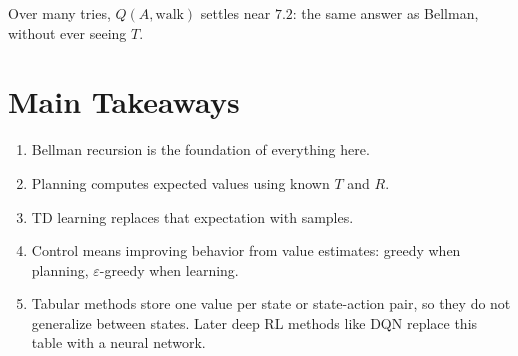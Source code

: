 \documentclass[11pt]{article}
\begin{document}
Over many tries, $Q(A, \text{walk})$ settles near $7.2$: the same answer as Bellman,
without ever seeing $T$.

\section{Main Takeaways}

\begin{enumerate}
  \item Bellman recursion is the foundation of everything here.
  \item Planning computes expected values using known $T$ and $R$.
  \item TD learning replaces that expectation with samples.
  \item Control means improving behavior from value estimates: greedy when planning,
        $\varepsilon$-greedy when learning.
  \item Tabular methods store one value per state or state-action pair, so they do not
        generalize between states. Later deep RL methods like DQN replace this table
        with a neural network.
\end{enumerate}
\end{document}
